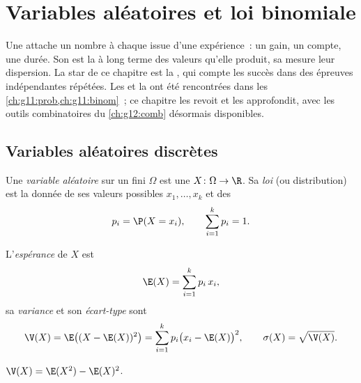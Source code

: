 \chapter{Variables aléatoires et loi binomiale}\label{ch:g12:randvar}

Une  attache un nombre à chaque issue d'une expérience~:
un gain, un compte, une durée. Son  est la  à long terme
des valeurs qu'elle produit, sa  mesure leur dispersion. La star de
ce chapitre est la , qui compte les succès dans des épreuves
indépendantes répétées. Les  et la  ont
été rencontrées dans les
\cref{ch:g11:prob,ch:g11:binom}~; ce chapitre les revoit et les approfondit,
avec les outils combinatoires du \cref{ch:g12:comb} désormais disponibles.

\section{Variables aléatoires discrètes}

\begin{definition}\label{def:g12:randvar:rv}
Une \emph{variable aléatoire} sur un  fini
$\Omega$ est une  $X \colon \Omega \to \R$. Sa
\emph{loi} (ou distribution) est la donnée de ses valeurs
possibles $x_1, \dots, x_k$ et des 
\[
p_i = \P(X = x_i), \qquad \sum_{i=1}^{k} p_i = 1 .
\]
\end{definition}

\begin{definition}\label{def:g12:randvar:exp}
L'\emph{espérance} de $X$ est
\[
\E(X) = \sum_{i=1}^{k} p_i\, x_i ,
\]
sa \emph{variance} et son \emph{écart-type} sont
\[
\V(X) = \E\bigl((X - \E(X))^2\bigr) = \sum_{i=1}^k p_i\bigl(x_i - \E(X)\bigr)^2,
\qquad
\sigma(X) = \sqrt{\V(X)} .
\]
\end{definition}

\begin{proposition}\label{prop:g12:randvar:konig}
$\V(X) = \E(X^2) - \E(X)^2$.
\end{proposition}


